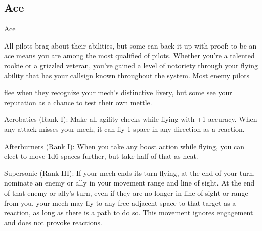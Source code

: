 \subsection{Ace}

                                                       Ace  

All pilots brag about their abilities, but some can back it up with proof: to be an ace means you are among  
the most qualified of pilots. Whether you’re a talented rookie or a grizzled veteran, you’ve gained a level of  
notoriety through your flying ability that has your callsign known throughout the system. Most enemy pilots  

flee when they recognize your mech’s distinctive livery, but some see your reputation as a chance to test  
their own mettle.   

Acrobatics  (Rank I): Make all agility checks while flying with +1 accuracy. When any attack  
misses your mech, it can fly 1 space in any direction as a reaction.
 
Afterburners  (Rank I): When you take any boost action while flying, you can elect to move 1d6  
spaces further, but take half of that as heat.
 
Supersonic (Rank III): If your mech ends its turn flying, at the end of your turn, nominate an  
enemy or ally in your movement range and line of sight. At the end of that enemy or ally’s turn,  
even if they are no longer in line of sight or range from you, your mech may fly to any free  
adjacent space to that target as a reaction, as long as there is a path to do so. This movement  
ignores engagement and does not provoke reactions.